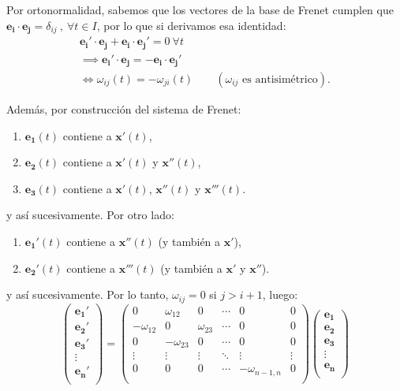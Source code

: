 Por ortonormalidad, sabemos que los vectores de la base de Frenet cumplen que $\mathbf{e_i \cdot e_j}=\delta_{ij} \ , \ \forall t\in I$, por lo que si derivamos esa identidad:
\begin{gather*}
    \mathbf{e_i'\cdot e_j}+\mathbf{e_i \cdot e_j'} =0 \ \forall t\\
    \implies \mathbf{e_i'\cdot e_j}=-\mathbf{e_i \cdot e_j'} \\
    \iff \boxed{\omega_{ij}(t)=-\omega_{ji}(t)} \qquad (\omega_{ij}\text{ es antisimétrico}).
\end{gather*}

Además, por construcción del sistema de Frenet:
\begin{enumerate}
    \item[] $\mathbf{e_1}(t)$ contiene a $\mathbf{x'}(t)$,
    \item[] $\mathbf{e_2}(t)$ contiene a $\mathbf{x'}(t)$ y $\mathbf{x''}(t)$,
    \item[] $\mathbf{e_3}(t)$ contiene a $\mathbf{x'}(t)$, $\mathbf{x''}(t)$ y $\mathbf{x'''}(t) $.
\end{enumerate}
y así sucesivamente. Por otro lado:
\begin{enumerate}
    \item[] $\mathbf{e_1'}(t)$ contiene a $\mathbf{x''}(t)$ (y también a $\mathbf{x'}$),
    \item[] $\mathbf{e_2'}(t)$ contiene a $\mathbf{x'''}(t)$ (y también a $\mathbf{x'}$ y $\mathbf{x''}$).
\end{enumerate}
y así sucesivamente. Por lo tanto, $\omega_{ij}=0$ si $j>i+1$, luego:
$$
\left ( 
\begin{array}{c}
     \mathbf{e_1}'  \\
     \mathbf{e_2}'  \\
     \mathbf{e_3}'  \\
     \vdots     \\
     \mathbf{e_n}'  \\
\end{array}
\right )=\left ( 
\begin{array}{cccccc}
    0 &\omega_{12} &0 &\cdots &0&0  \\
     -\omega_{12} &0 &\omega_{23} &\cdots &0&0  \\
     0 &-\omega_{23} &0 &\cdots &0&0  \\
     \vdots &\vdots  &\vdots  &\ddots &\vdots &\vdots   \\
     0 &0 &0 &\cdots &-\omega_{n-1,n}&0  \\
\end{array}
\right ) \left ( 
\begin{array}{c}
     \mathbf{e_1}  \\
     \mathbf{e_2}  \\
     \mathbf{e_3}  \\
     \vdots     \\
     \mathbf{e_n}  \\
\end{array}
\right )
$$

